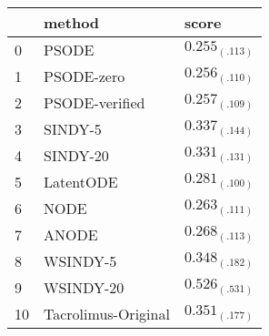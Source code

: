 \begin{tabular}{lll}
\toprule
 & method & score \\
\midrule
0 & PSODE & $0.255_{(.113)}$ \\
1 & PSODE-zero & $0.256_{(.110)}$ \\
2 & PSODE-verified & $0.257_{(.109)}$ \\
3 & SINDY-5 & $0.337_{(.144)}$ \\
4 & SINDY-20 & $0.331_{(.131)}$ \\
5 & LatentODE & $0.281_{(.100)}$ \\
6 & NODE & $0.263_{(.111)}$ \\
7 & ANODE & $0.268_{(.113)}$ \\
8 & WSINDY-5 & $0.348_{(.182)}$ \\
9 & WSINDY-20 & $0.526_{(.531)}$ \\
10 & Tacrolimus-Original & $0.351_{(.177)}$ \\
\bottomrule
\end{tabular}
